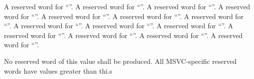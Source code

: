  A reserved word for ``''.
 A reserved word for ``''.
 A reserved word for ``''.
 A reserved word for ``''.
 A reserved word for ``''.
 A reserved word for ``''.
 A reserved word for ``''.
 A reserved word for ``''.
 A reserved word for ``''.
 A reserved word for ``''.
 A reserved word for ``''.
 A reserved word for ``''.
 A reserved word for ``''.
 A reserved word for ``''.


  No reserved word of this value shall be produced.  All MSVC-specific
reserved words have values greater than thi.s

